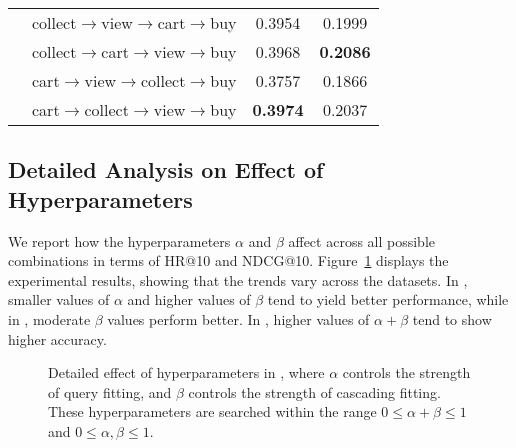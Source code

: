 \begin{table}[h]
\begin{tabular}{c|l|cc}
                        & collect$\rightarrow$view$\rightarrow$cart$\rightarrow$buy  & 0.3954                    & 0.1999                      \\
                        & collect$\rightarrow$cart$\rightarrow$view$\rightarrow$buy  & 0.3968                    & \bf 0.2086                      \\
                        & cart$\rightarrow$view$\rightarrow$collect$\rightarrow$buy  & 0.3757                    & 0.1866                      \\
                        & cart$\rightarrow$collect$\rightarrow$view$\rightarrow$buy  & \bf 0.3974                    & 0.2037                      \\ 
                        \bottomrule \hline
\end{tabular}
\end{table}


\newpage
\subsection{Detailed Analysis on Effect of Hyperparameters}
\label{sec:appendix:details:hyperparams}

We report how the hyperparameters $\alpha$ and $\beta$ affect \method across all possible combinations in terms of HR@10 and NDCG@10. 
Figure~\ref{fig:appendix:Hyper-sens-detail} displays the experimental results, showing that the trends vary across the datasets.
In \taobao, smaller values of $\alpha$ and higher values of $\beta$ tend to yield better performance, while in \tenrec, moderate $\beta$ values perform better.
In \tmall, higher values of $\alpha+\beta$ tend to show higher accuracy.

\begin{figure}[h]
    \centering

    \caption{
        \label{fig:appendix:Hyper-sens-detail}
        Detailed effect of hyperparameters in \method, where $\alpha$ controls the strength of query fitting, and $\beta$ controls the strength of cascading fitting. These hyperparameters are searched within the range $0 \leq \alpha + \beta \leq 1$ and $0 \leq \alpha, \beta \leq 1$. 
    }
\end{figure}




